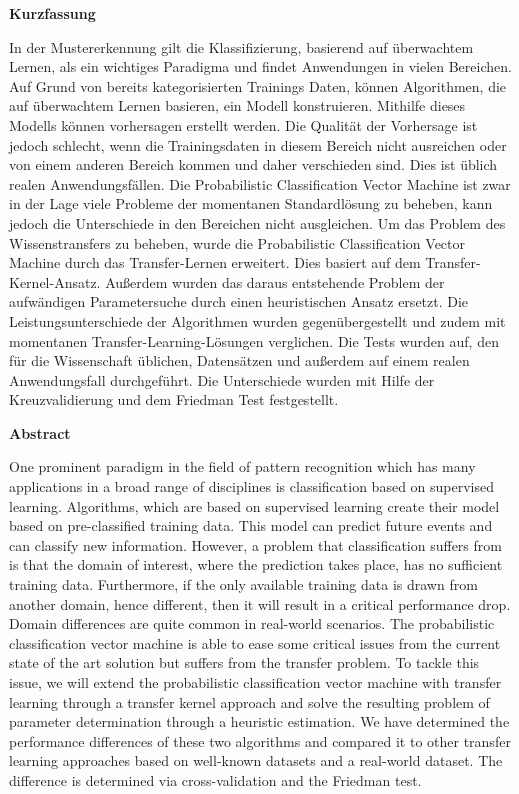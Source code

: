 \begin{center}
 	\Large\textbf{Kurzfassung}\\
\end{center}
In der Mustererkennung gilt die Klassifizierung, basierend auf überwachtem Lernen, als ein wichtiges Paradigma und findet Anwendungen in vielen Bereichen. Auf Grund von bereits kategorisierten Trainings Daten, können Algorithmen, die auf überwachtem Lernen basieren, ein Modell konstruieren. Mithilfe dieses Modells können vorhersagen erstellt werden. Die Qualität der Vorhersage ist jedoch schlecht, wenn die Trainingsdaten in diesem Bereich nicht ausreichen oder von einem anderen Bereich kommen und daher verschieden sind. Dies ist üblich realen Anwendungsfällen. Die Probabilistic Classification Vector Machine ist zwar in der Lage viele Probleme der momentanen Standardlösung zu beheben, kann jedoch die Unterschiede in den Bereichen nicht ausgleichen. Um das Problem des Wissenstransfers zu beheben, wurde die Probabilistic Classification Vector Machine durch das Transfer-Lernen erweitert. Dies basiert auf dem Transfer-Kernel-Ansatz. Außerdem wurden das daraus entstehende Problem der aufwändigen Parametersuche durch einen heuristischen Ansatz ersetzt. Die Leistungsunterschiede der Algorithmen wurden gegenübergestellt und zudem mit momentanen Transfer-Learning-Lösungen verglichen. Die Tests wurden auf, den für die Wissenschaft üblichen, Datensätzen und außerdem auf einem realen Anwendungsfall durchgeführt. Die Unterschiede wurden mit Hilfe der Kreuzvalidierung und dem Friedman Test festgestellt.
\newpage

\begin{center}
	\Large\textbf{Abstract}\\
\end{center}
One prominent paradigm in the field of pattern recognition which has many applications in a broad range of disciplines is classification based on supervised learning. 
Algorithms, which are based on supervised learning create their model based on pre-classified training data.
This model can predict future events and can classify new information.
However, a problem that classification suffers from is that the domain of interest, where the prediction takes place, has no sufficient training data. 
Furthermore, if the only available training data is drawn from another domain, hence different, then it will result in a critical performance drop.
Domain differences are quite common in real-world scenarios.
The probabilistic classification vector machine is able to ease some critical issues from the current state of the art solution but suffers from the transfer problem.
To tackle this issue, we will extend the probabilistic classification vector machine with transfer learning through a transfer kernel approach and solve the resulting problem of parameter determination through a heuristic estimation. 
We have determined the performance differences of these two algorithms and compared it to other transfer learning approaches based on well-known datasets and a real-world dataset. 
The difference is determined via cross-validation and the Friedman test.
